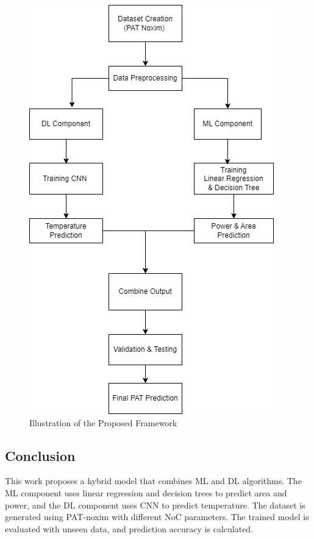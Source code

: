 \documentclass[conference]{IEEEtran}
\begin{document}
\begin{figure}[h]  %
    \centering
    \includegraphics[width=0.8\linewidth]{Proposed.png}  %
    \caption{Illustration of the Proposed Framework}  %
    \label{fig:proposed_framework}  %
\end{figure}

\subsection*{Conclusion}

This work proposes a hybrid model that combines ML and DL algorithms. The ML component uses linear regression and decision trees to predict area and power, and the DL component uses CNN to predict temperature. The dataset is generated using PAT-noxim with different NoC parameters. The trained model is evaluated with unseen data, and prediction accuracy is calculated.  
\end{document}
